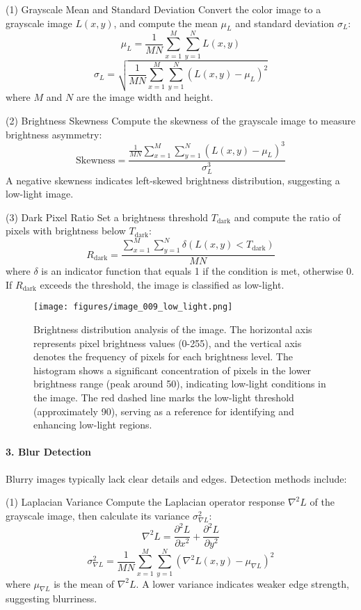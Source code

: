 \documentclass{apmcmthesis}
\begin{document}
(1) Grayscale Mean and Standard Deviation  
Convert the color image to a grayscale image $L(x, y)$, and compute the mean $\mu_L$ and standard deviation $\sigma_L$:  
\[
\mu_L = \frac{1}{MN} \sum_{x=1}^{M} \sum_{y=1}^{N} L(x, y)
\]
\[
\sigma_L = \sqrt{ \frac{1}{MN} \sum_{x=1}^{M} \sum_{y=1}^{N} \left( L(x, y) - \mu_L \right)^2 }
\]
where $M$ and $N$ are the image width and height.

(2) Brightness Skewness  
Compute the skewness of the grayscale image to measure brightness asymmetry:  
\[
\text{Skewness} = \frac{ \frac{1}{MN} \sum\limits_{x=1}^{M} \sum\limits_{y=1}^{N} \left( L(x, y) - \mu_L \right)^3 }{ \sigma_L^3 }
\]
A negative skewness indicates left-skewed brightness distribution, suggesting a low-light image.

(3) Dark Pixel Ratio  
Set a brightness threshold $T_{\text{dark}}$ and compute the ratio of pixels with brightness below $T_{\text{dark}}$:  
\[
R_{\text{dark}} = \frac{ \sum\limits_{x=1}^{M} \sum\limits_{y=1}^{N} \delta \left( L(x, y) < T_{\text{dark}} \right) }{ MN }
\]
where $\delta$ is an indicator function that equals 1 if the condition is met, otherwise 0. If $R_{\text{dark}}$ exceeds the threshold, the image is classified as low-light.

\begin{figure}[!ht]
    \centering
    \texttt{[image: figures/image\_009\_low\_light.png]}
    \caption{Brightness distribution analysis of the image. The horizontal axis represents pixel brightness values (0-255), and the vertical axis denotes the frequency of pixels for each brightness level. The histogram shows a significant concentration of pixels in the lower brightness range (peak around 50), indicating low-light conditions in the image. The red dashed line marks the low-light threshold (approximately 90), serving as a reference for identifying and enhancing low-light regions.}
\end{figure}

\paragraph{3. Blur Detection}
Blurry images typically lack clear details and edges. Detection methods include:

(1) Laplacian Variance  
Compute the Laplacian operator response $\nabla^2 L$ of the grayscale image, then calculate its variance $\sigma_{\nabla L}^2$:  
\[
\nabla^2 L = \frac{\partial^2 L}{\partial x^2} + \frac{\partial^2 L}{\partial y^2 }
\]
\[
\sigma_{\nabla L}^2 = \frac{1}{MN} \sum_{x=1}^{M} \sum_{y=1}^{N} \left( \nabla^2 L(x, y) - \mu_{\nabla L} \right)^2
\]
where $\mu_{\nabla L}$ is the mean of $\nabla^2 L$. A lower variance indicates weaker edge strength, suggesting blurriness.
\end{document}
